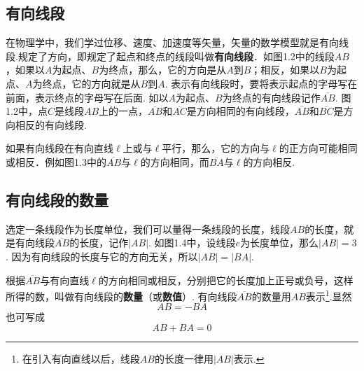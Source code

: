 \subsection{有向线段}
在物理学中，我们学过位移、速度、加速度等矢量，矢量的数学模型就是有向线段.规定了方向，即规定了起点和终点的线段叫做\textbf{有向线段}．如图1.2中的线段$AB$，如果以$A$为起点、$B$为终点，那么，它的方向是从$A$到$B$；相反，如果以$B$为起点、$A$为终点，它的方向就是从$B$到$A$. 表示有向线段时，要将表示起点的字母写在前面，表示终点的字母写在后面. 如以$A$为起点、$B$为终点的有向线段记作$\overline{AB}$. 图1.2中，点$C$是线段$AB$上的一点，$\overline{AB}$和$\overline{AC}$是方向相同的有向线段，$\overline{AB}$和$\overline{BC}$是方向相反的有向线段.

如果有向线段在有向直线$\ell$上或与$\ell$平行，那么，它的方向与$\ell$的正方向可能相同或相反．例如图1.3中的$\overline{AB}$与$\ell$的方向相同，而$\overline{BA}$与$\ell$的方向相反.

\noindent
\begin{minipage}{.45\textwidth}
\centering
{}    
\end{minipage}\hfill
\begin{minipage}{.45\textwidth}
\centering
{}    
\end{minipage}




\subsection{有向线段的数量}
选定一条线段作为长度单位，我们可以量得一条线段的长度，线段$AB$的长度，就是有向线段$\overline{AB}$的长度，记作$|AB|$. 如图1.4中，设线段$e$为长度单位，那么$|AB|=3$. 因为有向线段的长度与它的方向无关，所以$|AB|=|BA|$.

根据$\overline{AB}$与有向直线$\ell$的方向相同或相反，分别把它的长度加上正号或负号，这样所得的数，叫做有向线段的\textbf{数量}（或\textbf{数值}）. 有向线段$\overline{AB}$的数量用$AB$表示\footnote{在引入有向直线以后，线段$AB$的长度一律用$|AB|$表示.}.显然
\[AB=-BA\]
也可写成
\[AB+BA=0\]

